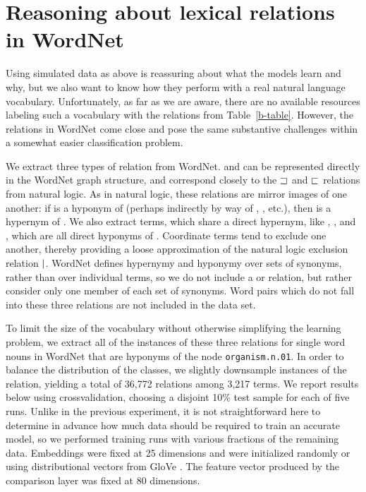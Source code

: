 \section{Reasoning about lexical relations in WordNet}\label{sec:wordnet}

Using simulated data as above is reassuring about what the models
learn and why, but we also want to know how they perform with a real
natural language vocabulary. Unfortunately, as far as we are aware,
there are no available resources labeling such a vocabulary with the
relations from Table~\ref{b-table}. However, the relations in WordNet
\cite{fellbaum2010wordnet} come close and pose the same substantive
challenges within a somewhat easier classification problem.


We extract three types of relation from WordNet.  and
 can be represented directly in the WordNet graph
structure, and correspond closely to the $\sqsupset$ and $\sqsubset$
relations from natural logic. As in natural logic, these relations are
mirror images of one another: if  is a hyponym of 
(perhaps indirectly by way of , , etc.), then
 is a hypernym of . We also extract 
terms, which share a direct hypernym, like , ,
and , which are all direct hyponyms of .  Coordinate
terms tend to exclude one another, thereby providing a loose approximation 
of the natural logic exclusion relation $\mathbin{|}$. 
WordNet defines hypernymy and hyponymy over
sets of synonyms, rather than over individual terms, so we do not
include a  or  relation, but rather
consider only one member of each set of synonyms. Word pairs which do
not fall into these three relations are not included in the data set.

To limit the size of the vocabulary without otherwise simplifying the learning problem, we extract all of the
instances of these three relations for single word nouns in WordNet that are hyponyms of the node 
\texttt{organism.n.01}. In order to balance the distribution of the classes, we slightly downsample instances 
of the  relation, yielding a total of 36,772 relations among 3,217 terms. We report results below using crossvalidation, choosing a disjoint 10\% test sample for each of five runs. Unlike in the previous experiment,
it is not straightforward here to determine in advance
how much data should be required to train an accurate model, so we performed training runs with 
various fractions of the remaining data. Embeddings were fixed at 25 dimensions and were initialized 
randomly or using distributional vectors from GloVe \cite{pennington2014glove}. The feature vector 
produced by the comparison layer was fixed at 80 dimensions.

